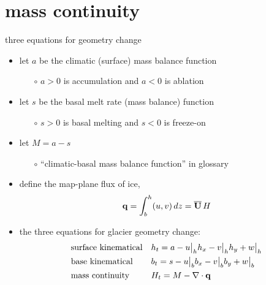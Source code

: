 
\section{mass continuity}


\begin{frame}{three equations for geometry change}

\begin{itemize}
\item let $a$ be the climatic (surface) mass balance function
    \begin{itemize}
    \item[$\circ$] $a>0$ is accumulation and $a<0$ is ablation
    \end{itemize}
\item let $s$ be the basal melt rate (mass balance) function
    \begin{itemize}
    \item[$\circ$] $s>0$ is basal melting and $s<0$ is freeze-on
    \end{itemize}
\item let $M=a-s$
    \begin{itemize}
    \item[$\circ$] ``climatic-basal mass balance function'' in glossary
    \end{itemize}
\item define the map-plane flux of ice,
	$$\mathbf{q} = \int_{b}^{h} (u,v)\,dz = \overline{\mathbf{U}}\,H$$
\item the three equations for glacier geometry change:
\begin{align*}
&\text{surface kinematical} && h_t = a - u\big|_h h_x - v\big|_h h_y + w\big|_h  \\
&\text{base kinematical} && b_t = s - u\big|_b b_x - v\big|_b b_y + w\big|_b  \\
&\text{mass continuity} && H_t = M - \nabla\cdot \mathbf{q} \\
\end{align*}
\end{itemize}
\end{frame}


